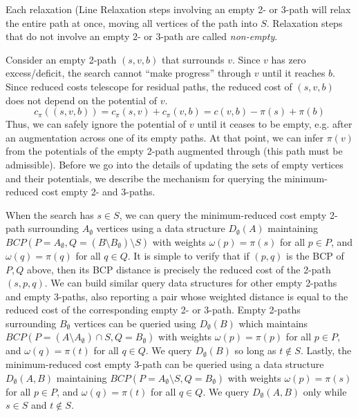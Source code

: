 \documentclass[11pt]{article}
\theoremstyle{plain}
\begin{document}
Each relaxation (Line
Relaxation steps involving an empty 2- or 3-path will relax the entire path
at once, moving all vertices of the path into $S$.
Relaxation steps that do not involve an empty 2- or 3-path are called
\emph{non-empty}.

Consider an empty 2-path $(s, v, b)$ that surrounds $v$.
Since $v$ has zero excess/deficit, the search cannot ``make progress'' through
$v$ until it reaches $b$.
Since reduced costs telescope for residual paths, the reduced cost of
$(s, v, b)$ does not depend on the potential of $v$.
\begin{equation*}
	c_\pi((s, v, b)) = c_\pi(s, v) + c_\pi(v, b) = c(v, b) - \pi(s) + \pi(b)
\end{equation*}
Thus, we can safely ignore the potential of $v$ until it ceases to be
empty, e.g. after an augmentation across one of its empty paths.
At that point, we can infer $\pi(v)$ from the potentials of the empty 2-path
augmented through (this path must be admissible).
Before we go into the details of updating the sets of empty vertices and their
potentials, we describe the mechanism for querying the minimum-reduced cost
empty 2- and 3-paths.

When the search has $s \in S$, we can query the minimum-reduced cost empty
2-path surrounding $A_\emptyset$ vertices using a data structure
$D_\emptyset(A)$ maintaining
$BCP(P = A_\emptyset, Q = (B \setminus B_\emptyset) \setminus S)$ with weights
$\omega(p) = \pi(s)$ for all $p \in P$, and $\omega(q) = \pi(q)$ for all
$q \in Q$.
It is simple to verify that if $(p, q)$ is the BCP of $P, Q$ above, then its
BCP distance is precisely the reduced cost of the 2-path $(s, p, q)$.
We can build similar query data structures for other empty 2-paths and empty
3-paths, also reporting a pair whose weighted distance is equal to the reduced
cost of the corresponding empty 2- or 3-path.
Empty 2-paths surrounding $B_\emptyset$ vertices can be queried using
$D_\emptyset(B)$ which maintains
$BCP(P = (A \setminus A_\emptyset) \cap S, Q = B_\emptyset)$ with weights
$\omega(p) = \pi(p)$ for all $p \in P$, and $\omega(q) = \pi(t)$ for all
$q \in Q$.
We query $D_\emptyset(B)$ so long as $t \not\in S$.
Lastly, the minimum-reduced cost empty 3-path can be queried using a data
structure $D_\emptyset(A, B)$ maintaining
$BCP(P = A_\emptyset \setminus S, Q = B_\emptyset)$ with weights
$\omega(p) = \pi(s)$ for all $p \in P$, and $\omega(q) = \pi(t)$ for all
$q \in Q$.
We query $D_\emptyset(A, B)$ only while $s \in S$ and $t \not\in S$.
\end{document}
